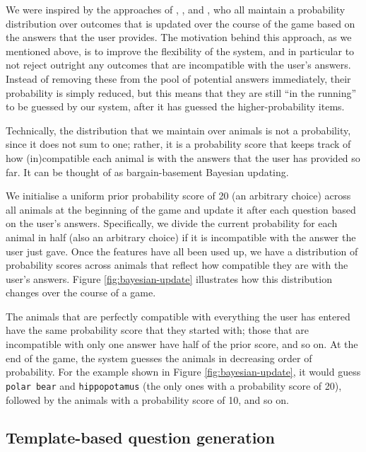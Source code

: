 \documentclass[11pt,a4paper]{article}
\begin{document}
We were inspired by the approaches of \citet{DeyEa2019}, \citet{HuEa2018}, and \citet{Burgener2006}, who all maintain a probability distribution over outcomes that is updated over the course of the game based on the answers that the user provides.
The motivation behind this approach, as we mentioned above, is to improve the flexibility of the system, and in particular to not reject outright any outcomes that are incompatible with the user's answers.
Instead of removing these from the pool of potential answers immediately, their probability is simply reduced, but this means that they are still ``in the running'' to be guessed by our system, after it has guessed the higher-probability items.

Technically, the distribution that we maintain over animals is not a probability, since it does not sum to one; rather, it is a probability score that keeps track of how (in)compatible each animal is with the answers that the user has provided so far.
It can be thought of as bargain-basement Bayesian updating.

We initialise a uniform prior probability score of 20 (an arbitrary choice) across all animals at the beginning of the game and update it after each question based on the user's answers.
Specifically, we divide the current probability for each animal in half (also an arbitrary choice) if it is incompatible with the answer the user just gave.
Once the features have all been used up, we have a distribution of probability scores across animals that reflect how compatible they are with the user's answers.
Figure \ref{fig:bayesian-update} illustrates how this distribution changes over the course of a game.

The animals that are perfectly compatible with everything the user has entered have the same probability score that they started with; those that are incompatible with only one answer have half of the prior score, and so on.
At the end of the game, the system guesses the animals in decreasing order of probability.
For the example shown in Figure \ref{fig:bayesian-update}, it would guess \texttt{polar bear} and \texttt{hippopotamus} (the only ones with a probability score of 20), followed by the animals with a probability score of 10, and so on.

\subsection{Template-based question generation}
\label{subsec:qg}
\end{document}
